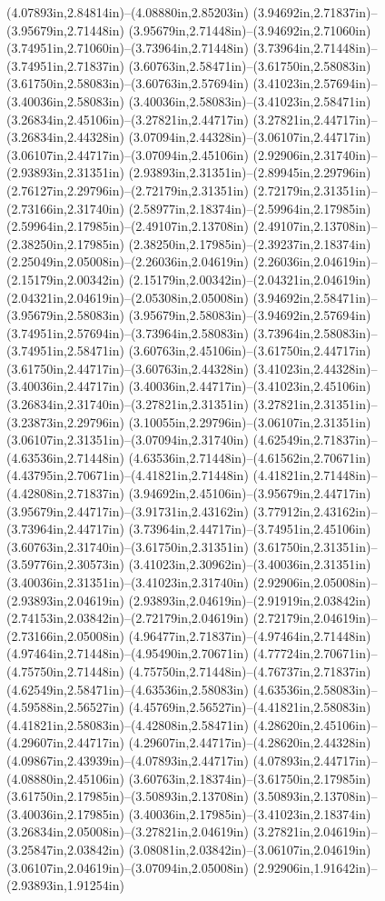 (4.07893in,2.84814in)--(4.08880in,2.85203in) (3.94692in,2.71837in)--(3.95679in,2.71448in) (3.95679in,2.71448in)--(3.94692in,2.71060in) (3.74951in,2.71060in)--(3.73964in,2.71448in) (3.73964in,2.71448in)--(3.74951in,2.71837in) (3.60763in,2.58471in)--(3.61750in,2.58083in) (3.61750in,2.58083in)--(3.60763in,2.57694in) (3.41023in,2.57694in)--(3.40036in,2.58083in) (3.40036in,2.58083in)--(3.41023in,2.58471in) (3.26834in,2.45106in)--(3.27821in,2.44717in) (3.27821in,2.44717in)--(3.26834in,2.44328in) (3.07094in,2.44328in)--(3.06107in,2.44717in) (3.06107in,2.44717in)--(3.07094in,2.45106in) (2.92906in,2.31740in)--(2.93893in,2.31351in) (2.93893in,2.31351in)--(2.89945in,2.29796in) (2.76127in,2.29796in)--(2.72179in,2.31351in) (2.72179in,2.31351in)--(2.73166in,2.31740in) (2.58977in,2.18374in)--(2.59964in,2.17985in) (2.59964in,2.17985in)--(2.49107in,2.13708in) (2.49107in,2.13708in)--(2.38250in,2.17985in) (2.38250in,2.17985in)--(2.39237in,2.18374in) (2.25049in,2.05008in)--(2.26036in,2.04619in) (2.26036in,2.04619in)--(2.15179in,2.00342in) (2.15179in,2.00342in)--(2.04321in,2.04619in) (2.04321in,2.04619in)--(2.05308in,2.05008in) (3.94692in,2.58471in)--(3.95679in,2.58083in) (3.95679in,2.58083in)--(3.94692in,2.57694in) (3.74951in,2.57694in)--(3.73964in,2.58083in) (3.73964in,2.58083in)--(3.74951in,2.58471in) (3.60763in,2.45106in)--(3.61750in,2.44717in) (3.61750in,2.44717in)--(3.60763in,2.44328in) (3.41023in,2.44328in)--(3.40036in,2.44717in) (3.40036in,2.44717in)--(3.41023in,2.45106in) (3.26834in,2.31740in)--(3.27821in,2.31351in) (3.27821in,2.31351in)--(3.23873in,2.29796in) (3.10055in,2.29796in)--(3.06107in,2.31351in) (3.06107in,2.31351in)--(3.07094in,2.31740in) (4.62549in,2.71837in)--(4.63536in,2.71448in) (4.63536in,2.71448in)--(4.61562in,2.70671in) (4.43795in,2.70671in)--(4.41821in,2.71448in) (4.41821in,2.71448in)--(4.42808in,2.71837in) (3.94692in,2.45106in)--(3.95679in,2.44717in) (3.95679in,2.44717in)--(3.91731in,2.43162in) (3.77912in,2.43162in)--(3.73964in,2.44717in) (3.73964in,2.44717in)--(3.74951in,2.45106in) (3.60763in,2.31740in)--(3.61750in,2.31351in) (3.61750in,2.31351in)--(3.59776in,2.30573in) (3.41023in,2.30962in)--(3.40036in,2.31351in) (3.40036in,2.31351in)--(3.41023in,2.31740in) (2.92906in,2.05008in)--(2.93893in,2.04619in) (2.93893in,2.04619in)--(2.91919in,2.03842in) (2.74153in,2.03842in)--(2.72179in,2.04619in) (2.72179in,2.04619in)--(2.73166in,2.05008in) (4.96477in,2.71837in)--(4.97464in,2.71448in) (4.97464in,2.71448in)--(4.95490in,2.70671in) (4.77724in,2.70671in)--(4.75750in,2.71448in) (4.75750in,2.71448in)--(4.76737in,2.71837in) (4.62549in,2.58471in)--(4.63536in,2.58083in) (4.63536in,2.58083in)--(4.59588in,2.56527in) (4.45769in,2.56527in)--(4.41821in,2.58083in) (4.41821in,2.58083in)--(4.42808in,2.58471in) (4.28620in,2.45106in)--(4.29607in,2.44717in) (4.29607in,2.44717in)--(4.28620in,2.44328in) (4.09867in,2.43939in)--(4.07893in,2.44717in) (4.07893in,2.44717in)--(4.08880in,2.45106in) (3.60763in,2.18374in)--(3.61750in,2.17985in) (3.61750in,2.17985in)--(3.50893in,2.13708in) (3.50893in,2.13708in)--(3.40036in,2.17985in) (3.40036in,2.17985in)--(3.41023in,2.18374in) (3.26834in,2.05008in)--(3.27821in,2.04619in) (3.27821in,2.04619in)--(3.25847in,2.03842in) (3.08081in,2.03842in)--(3.06107in,2.04619in) (3.06107in,2.04619in)--(3.07094in,2.05008in) (2.92906in,1.91642in)--(2.93893in,1.91254in) 
